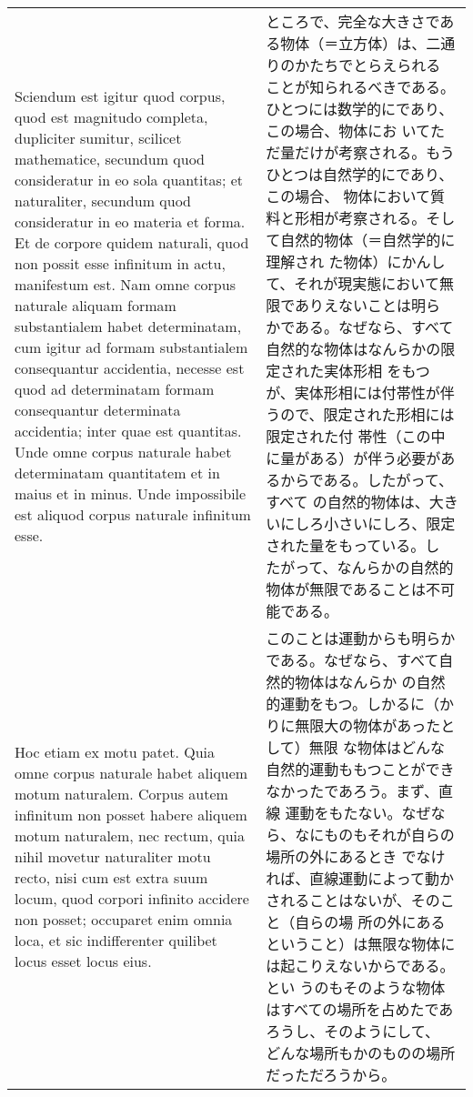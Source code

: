 \documentclass[10pt]{jsarticle} %
\begin{document}
\begin{longtable}{p{21em}p{21em}}
\\

Sciendum est igitur quod corpus, quod est magnitudo completa,
 dupliciter sumitur, scilicet mathematice, secundum quod consideratur in
 eo sola quantitas; et naturaliter, secundum quod consideratur in eo
 materia et forma. Et de corpore quidem naturali, quod non possit esse
 infinitum in actu, manifestum est. Nam omne corpus naturale aliquam
 formam substantialem habet determinatam, cum igitur ad formam
 substantialem consequantur accidentia, necesse est quod ad determinatam
 formam consequantur determinata accidentia; inter quae est
 quantitas. Unde omne corpus naturale habet determinatam quantitatem et
 in maius et in minus. Unde impossibile est aliquod corpus naturale
 infinitum esse. 

&

ところで、完全な大きさである物体（＝立方体）は、二通りのかたちでとらえられる
 ことが知られるべきである。ひとつには数学的にであり、この場合、物体にお
 いてただ量だけが考察される。もうひとつは自然学的にであり、この場合、
 物体において質料と形相が考察される。そして自然的物体（＝自然学的に理解され
 た物体）にかんして、それが現実態において無限でありえないことは明ら
 かである。なぜなら、すべて自然的な物体はなんらかの限定された実体形相
 をもつが、実体形相には付帯性が伴うので、限定された形相には限定された付
 帯性（この中に量がある）が伴う必要があるからである。したがって、すべて
 の自然的物体は、大きいにしろ小さいにしろ、限定された量をもっている。し
 たがって、なんらかの自然的物体が無限であることは不可能である。


\\


Hoc etiam ex motu patet. Quia omne corpus naturale habet aliquem motum
 naturalem. Corpus autem infinitum non posset habere aliquem motum
 naturalem, nec rectum, quia nihil movetur naturaliter motu recto, nisi
 cum est extra suum locum, quod corpori infinito accidere non posset;
 occuparet enim omnia loca, et sic indifferenter quilibet locus esset
 locus eius. 

&

このことは運動からも明らかである。なぜなら、すべて自然的物体はなんらか
 の自然的運動をもつ。しかるに（かりに無限大の物体があったとして）無限
 な物体はどんな自然的運動ももつことができなかったであろう。まず、直線
 運動をもたない。なぜなら、なにものもそれが自らの場所の外にあるとき
 でなければ、直線運動によって動かされることはないが、そのこと（自らの場
 所の外にあるということ）は無限な物体には起こりえないからである。とい
 うのもそのような物体はすべての場所を占めたであろうし、そのようにして、
 どんな場所もかのものの場所だっただろうから。




\end{longtable}
\end{document}
